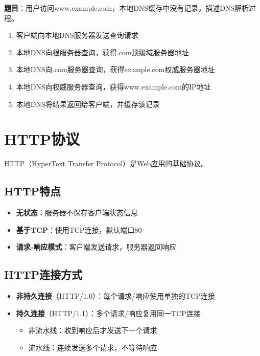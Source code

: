 \begin{examplebox}[例题6.1 DNS查询]
\textbf{题目}：用户访问www.example.com，本地DNS缓存中没有记录，描述DNS解析过程。
\tcblower
\begin{enumerate}[itemsep=0pt]
    \item 客户端向本地DNS服务器发送查询请求
    \item 本地DNS向根服务器查询，获得.com顶级域服务器地址
    \item 本地DNS向.com服务器查询，获得example.com权威服务器地址
    \item 本地DNS向权威服务器查询，获得www.example.com的IP地址
    \item 本地DNS将结果返回给客户端，并缓存该记录
\end{enumerate}
\end{examplebox}

\section{HTTP协议}
HTTP（HyperText Transfer Protocol）是Web应用的基础协议。

\subsection{HTTP特点}
\begin{itemize}[leftmargin=2em,itemsep=0pt]
    \item \textbf{无状态}：服务器不保存客户端状态信息
    \item \textbf{基于TCP}：使用TCP连接，默认端口80
    \item \textbf{请求-响应模式}：客户端发送请求，服务器返回响应
\end{itemize}

\subsection{HTTP连接方式}
\begin{itemize}[leftmargin=2em,itemsep=0pt]
    \item \textbf{非持久连接}（HTTP/1.0）：每个请求/响应使用单独的TCP连接
    \item \textbf{持久连接}（HTTP/1.1）：多个请求/响应复用同一TCP连接
    \begin{itemize}[itemsep=0pt]
        \item 非流水线：收到响应后才发送下一个请求
        \item 流水线：连续发送多个请求，不等待响应
    \end{itemize}
\end{itemize}


